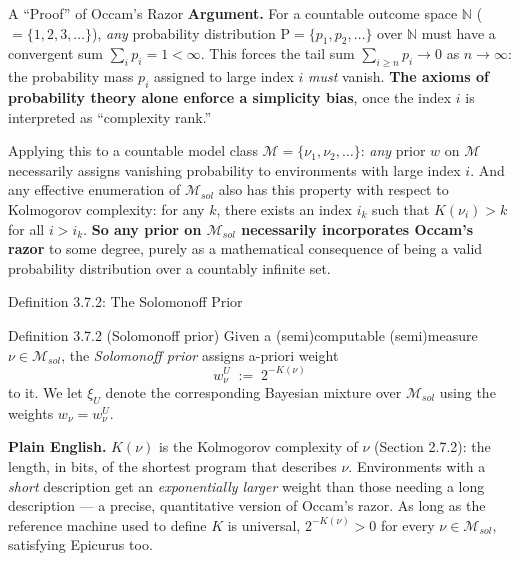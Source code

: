 \documentclass[aspectratio=169,10pt]{beamer}
\newcommand{\N}{\mathbb{N}}
\newcommand{\Mcal}{\mathcal{M}}
\begin{document}
\begin{frame}{A ``Proof'' of Occam's Razor}
  \textbf{Argument.} For a countable outcome space $\N$ ($=\{1,2,3,\dots\}$),
  \emph{any} probability distribution $\mathrm{P}=\{p_1,p_2,\dots\}$ over
  $\N$ must have a convergent sum $\sum_i p_i = 1 < \infty$. This forces the
  tail sum $\sum_{i\ge n} p_i \to 0$ as $n\to\infty$: the probability mass
  $p_i$ assigned to large index $i$ \emph{must} vanish. \textbf{The axioms of
  probability theory alone enforce a simplicity bias}, once the index $i$ is
  interpreted as ``complexity rank.''

  \vspace{2mm}
  Applying this to a countable model class $\Mcal=\{\nu_1,\nu_2,\dots\}$:
  \emph{any} prior $w$ on $\Mcal$ necessarily assigns vanishing probability
  to environments with large index $i$. And any effective enumeration of
  $\Mcal_{sol}$ also has this property with respect to Kolmogorov complexity:
  for any $k$, there exists an index $i_k$ such that $K(\nu_i)>k$ for all
  $i>i_k$. \textbf{So any prior on $\Mcal_{sol}$ necessarily incorporates
  Occam's razor} to some degree, purely as a mathematical consequence of
  being a valid probability distribution over a countably infinite set.
\end{frame}

\begin{frame}{Definition 3.7.2: The Solomonoff Prior}
  \begin{block}{Definition 3.7.2 (Solomonoff prior)}
    Given a (semi)computable (semi)measure $\nu\in\Mcal_{sol}$, the
    \emph{Solomonoff prior} assigns a-priori weight
    \[
      w_\nu^U \; := \; 2^{-K(\nu)}
    \]
    to it. We let $\xi_U$ denote the corresponding Bayesian mixture over
    $\Mcal_{sol}$ using the weights $w_\nu=w_\nu^U$.
  \end{block}
  \textbf{Plain English.} $K(\nu)$ is the Kolmogorov complexity of $\nu$
  (Section 2.7.2): the length, in bits, of the shortest program that
  describes $\nu$. Environments with a \emph{short} description get an
  \emph{exponentially larger} weight than those needing a long description
  --- a precise, quantitative version of Occam's razor. As long as the
  reference machine used to define $K$ is universal, $2^{-K(\nu)}>0$ for
  every $\nu\in\Mcal_{sol}$, satisfying Epicurus too.
\end{frame}
\end{document}
